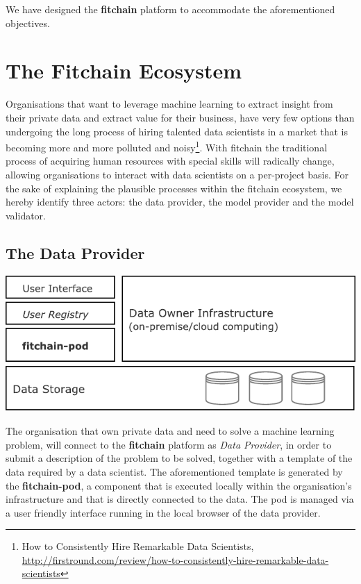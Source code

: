 \documentclass[12pt, a4paper,titlepage]{extreport}
\begin{document}
We have designed the \textbf{fitchain} platform to accommodate the aforementioned objectives. 


\section{The Fitchain Ecosystem}\label{ecosystem}
Organisations that want to leverage machine learning to extract insight from their private data and extract value for their business, have very few options than undergoing the long process of hiring talented data scientists in a market that is becoming more and more polluted and noisy\footnote{How to Consistently Hire Remarkable Data Scientists, \url{http://firstround.com/review/how-to-consistently-hire-remarkable-data-scientists}}. 
With fitchain the traditional process of acquiring human resources with special skills will radically change, allowing organisations to interact with data scientists on a per-project basis. For the sake of explaining the plausible processes within the fitchain ecosystem, we hereby identify three actors: the data provider, the model provider and  the model validator.

\subsection{The Data Provider}

\begin{center}
\includegraphics[scale=1]{pod_dataowner.pdf} 
\end{center}

The organisation that own private data and need to solve a machine learning problem, will connect to the \textbf{fitchain} platform as \emph{Data Provider}, in order to submit a description of the problem to be solved, together with a template of the data required by a data scientist. 
The aforementioned template is generated by the \textbf{fitchain-pod}, a component that is executed locally within the organisation's infrastructure and that is directly connected to the data. The pod is managed via a user friendly interface running in the local browser of the data provider.
 
\end{document}
